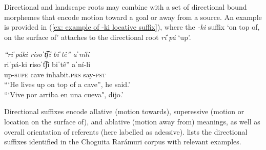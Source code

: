     \z
\z


Directional and landscape roots may combine with a set of directional bound morphemes that encode motion toward a goal or away from a source. An example is provided in (\ref{ex: example of -ki locative suffix}), where the \textit{-ki} suffix `on top of, on the surface of' attaches to the directional root \textit{riˈpá} `up'.

\ea\label{ex: example of -ki locative suffix}

    {\textit{“riˈpáki   risoˈt͡ʃí     biˈtê”     aˈníli}}\\
    \gll    riˈpá-ki   risoˈt͡ʃí     biˈtê”     aˈní-li\\
            up-\textsc{supe}  cave  inhabit.\textsc{prs}    say-\textsc{pst}\\
    \glt    ```He lives up on top of a cave”, he said.’\\
    \glt    ```Vive por arriba en una cueva", dijo.' \\

\z

Directional suffixes encode allative (motion towards), superessive (motion or location on the surface of), and ablative (motion away from) meanings, as well as overall orientation of referents (here labelled as adessive).  lists the directional suffixes identified in the Choguita Rarámuri corpus with relevant examples.


